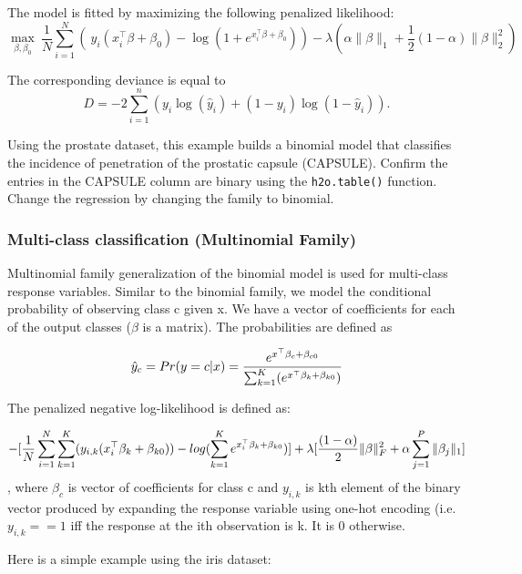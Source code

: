 The model is fitted by maximizing the following penalized likelihood: 
$$  \max_{\beta,\beta_0} \  \frac{1}{N} \sum_{i=1}^{N} \left( \ y_i (x_i^{\top}\beta  + \beta_0) - \log (1 + e^{x_i^{\top}\beta  + \beta_0} ) \right)  - \lambda \left( \alpha \|\beta \|_1 +  \frac{1}{2}(1- \alpha)  \| \beta \|_2^2 \right)$$

The corresponding deviance is equal to 
$$D = -2\sum_{i=1}^{n} \left(y_i \log(\hat{y}_i) + (1 - y_i)\log(1-\hat{y}_i)  \right).$$



Using the prostate dataset, this example builds a binomial model that classifies the incidence of penetration of the prostatic
capsule (CAPSULE). Confirm the entries in the CAPSULE column are binary using the \texttt{h2o.table()}
function. Change the regression by changing the family to binomial.

\waterExampleInR



\subsubsection{Multi-class classification (Multinomial Family)}
Multinomial family generalization of the binomial model is used for multi-class response variables. Similar to the
binomial family, we model the conditional probability of observing class c given x. We have a vector of coefficients
for each of the output classes ($\beta$ is a matrix). The probabilities are defined as

$$ \hat{y}_c = Pr(y = c|x) = {e^{x^{\top}\beta_c + \beta_{c0}} \over \sum_{k=1}^K (e^{x^{\top}\beta_k + \beta_{k0}}) }$$ 

The penalized negative log-likelihood is defined as:

$$
- \lbrack {1\over{N}} \sum_{i=1}^N\sum_{k=1}^K(y_{i,k}(x_i^{\top}\beta_k + \beta_{k0})) - log(\sum_{k=1}^Ke^{x_i^{\top}\beta_k + \beta_{k0}}) \rbrack + \lambda \lbrack {(1-\alpha) \over 2} \| \beta \|_F^2 + \alpha\sum_{j=1}^P \|\beta_j\|_1 \rbrack 
$$
, where $\beta_c$ is vector of coefficients for class c and $y_{i,k}$ is kth element of the binary vector produced by
expanding the response variable using one-hot encoding (i.e. $y_{i,k} == 1$ iff the response at the ith observation
is k. It is 0 otherwise.

Here is a simple example using the iris dataset:


\waterExampleInR


